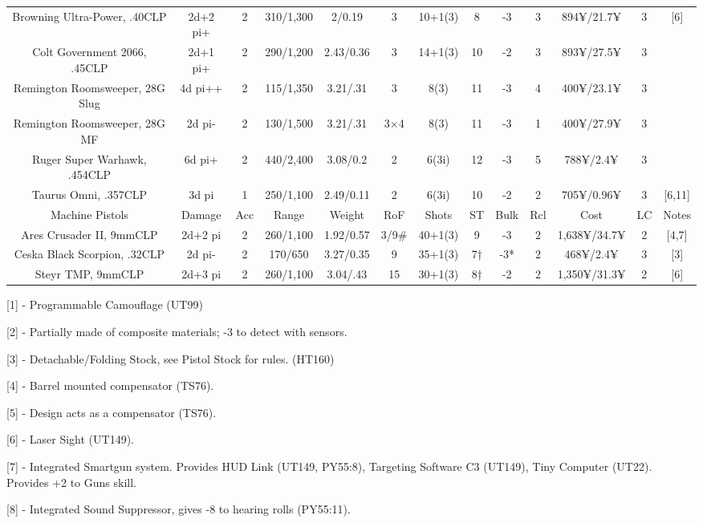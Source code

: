 \begin{center}
\begin{adjustwidth}{-10.3mm}{}
{\begin{tabular}{|c|c|c|c|c|c|c|c|c|c|c|c|c|}
				Browning Ultra-Power, .40CLP & 2d+2 pi+ & 2 & 310/1,300 & 2/0.19 & 3 & 10+1(3) & 8 & -3 & 3 & 894¥/21.7¥ & 3 & [6] \\
				Colt Government 2066, .45CLP & 2d+1 pi+ & 2 & 290/1,200 & 2.43/0.36 & 3 & 14+1(3) & 10 & -2 & 3 & 893¥/27.5¥ & 3  &\\
				Remington Roomsweeper, 28G Slug & 4d pi++ & 2 & 115/1,350 & 3.21/.31 & 3 & 8(3) & 11 & -3 & 4 & 400¥/23.1¥ & 3  & \\
				Remington Roomsweeper, 28G MF & 2d pi- & 2 & 130/1,500 & 3.21/.31 & 3×4 & 8(3) & 11 & -3 & 1 & 400¥/27.9¥ & 3 &	\\
				Ruger Super Warhawk, .454CLP & 6d pi+ & 2 & 440/2,400 & 3.08/0.2 & 2 & 6(3i) & 12 & -3 & 5 & 788¥/2.4¥ & 3 	&\\
				Taurus Omni, .357CLP  & 3d pi & 1 & 250/1,100 & 2.49/0.11 & 2 & 6(3i) & 10 & -2 & 2 & 705¥/0.96¥ & 3 & [6,11]\\
				\hline
				Machine Pistols & Damage & Acc & Range & Weight & RoF & Shots & ST & Bulk & Rcl & Cost & LC & Notes\\
				\hline
				Ares Crusader II, 9mmCLP & 2d+2 pi & 2 & 260/1,100 & 1.92/0.57 & 3/9\# & 40+1(3) & 9 & -3 & 2 & 1,638¥/34.7¥ & 2 & [4,7] \\
				Ceska Black Scorpion, .32CLP & 2d pi- & 2 & 170/650 & 3.27/0.35 & 9 & 35+1(3) & 7† & -3* & 2 & 468¥/2.4¥ & 3 & [3] \\
				Steyr TMP, 9mmCLP & 2d+3 pi & 2 & 260/1,100 & 3.04/.43 & 15 & 30+1(3) & 8† & -2 & 2 & 1,350¥/31.3¥ & 2 & [6] \\
				\hline
			\end{tabular}
		}
	\end{adjustwidth}
\end{center}

[1] - Programmable Camouflage (UT99)

[2] - Partially made of composite materials; -3 to detect with sensors.

[3] - Detachable/Folding Stock, see Pistol Stock for rules. (HT160)

[4] - Barrel mounted compensator (TS76).

[5] - Design acts as a compensator (TS76).

[6] - Laser Sight (UT149).

[7] - Integrated Smartgun system. Provides HUD Link (UT149, PY55:8), Targeting Software C3 (UT149), Tiny Computer (UT22). Provides +2 to Guns skill.

[8] - Integrated Sound Suppressor, gives -8 to hearing rolls (PY55:11).

